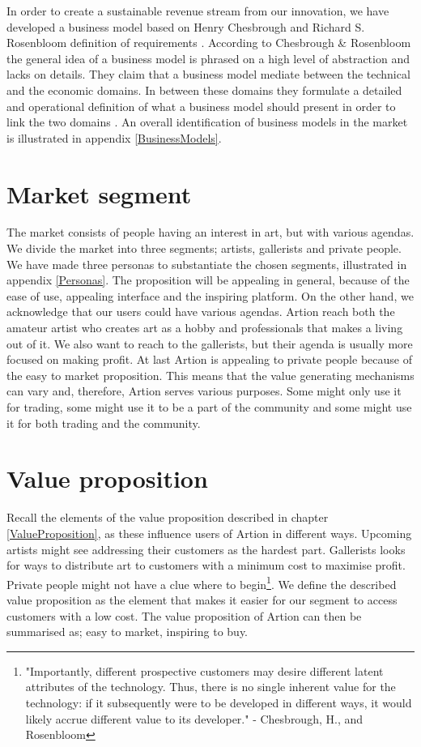 In order to create a sustainable revenue stream from our innovation, we have developed a business model based on Henry Chesbrough and Richard S. Rosenbloom definition of requirements \cite[553]{BusinessModel}. According to Chesbrough \& Rosenbloom the general idea of a business model is phrased on a high level of abstraction and lacks on details. They claim that a business model mediate between the technical and the economic domains. In between these domains they formulate a detailed and operational definition of what a business model should present in order to link the two domains \cite[536]{BusinessModel}. An overall identification of business models in the market is illustrated in appendix \ref{BusinessModels}.

\section{Market segment}
\label{Segment}
The market consists of people having an interest in art, but with various agendas. We divide the market into three segments; artists, gallerists and private people. We have made three personas to substantiate the chosen segments, illustrated in appendix \ref{Personas}. The proposition will be appealing in general, because of the ease of use, appealing interface and the inspiring platform. On the other hand, we acknowledge that our users could have various agendas. 
Artion reach both the amateur artist who creates art as a hobby and professionals that makes a living out of it. We also want to reach to the gallerists, but their agenda is usually more focused on making profit. At last Artion is appealing to private people because of the easy to market proposition.
This means that the value generating mechanisms can vary and, therefore, Artion serves various purposes. Some might only use it for trading, some might use it to be a part of the community and some might use it for both trading and the community.

\section{Value proposition}
Recall the elements of the value proposition described in chapter \ref{ValueProposition}, as these influence users of Artion in different ways. Upcoming artists might see addressing their customers as the hardest part. Gallerists looks for ways to distribute art to customers with a minimum cost to maximise profit. Private people might not have a clue where to begin\footnote{"Importantly, different prospective customers may desire different latent attributes of the technology. Thus, there is no single inherent value for the technology: if it subsequently were to be developed in different ways, it would likely accrue different value to its developer." - Chesbrough, H., and Rosenbloom}. We define the described value proposition as the element that makes it easier for our segment to access customers with a low cost. The value proposition of Artion can then be summarised as; easy to market, inspiring to buy. 

